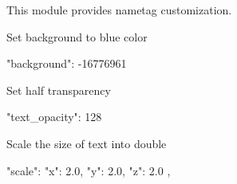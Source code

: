 This module provides nametag customization.

\begin{example}{Set background to blue color}
    \begin{jsoncode}
        "background": -16776961
    \end{jsoncode}
\end{example}

\begin{example}{Set half transparency}
    \begin{jsoncode}
        "text_opacity": 128
    \end{jsoncode}
\end{example}

\begin{example}{Scale the size of text into double}
    \begin{jsoncode}
        "scale": {
            "x": 2.0,
            "y": 2.0,
            "z": 2.0
        },
    \end{jsoncode}

\end{example}
